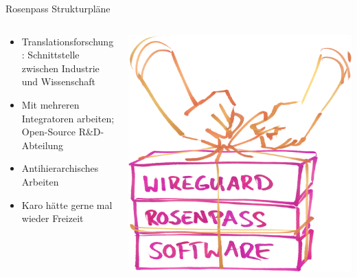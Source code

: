 \documentclass{rosenpass-beamer}
\begin{document}
\begin{frame}{Rosenpass Strukturpläne}
\begin{columns}[c]
\begin{column}{0.7\textwidth}
\begin{itemize}
  \item Translationsforschung: Schnittstelle zwischen Industrie und Wissenschaft
  \item Mit mehreren Integratoren arbeiten; Open-Source R\&D-Abteilung
  \item Antihierarchisches Arbeiten
  \item Karo hätte gerne mal wieder Freizeit
\end{itemize}
\end{column}

\begin{column}{0.2\textwidth}
\includegraphics[width=\linewidth]{graphics/rosenpass in anderen apps.png}


\end{column}
\end{columns}
\end{frame}
\end{document}

